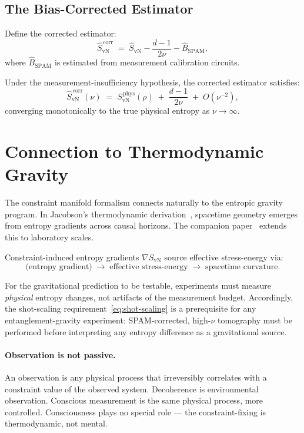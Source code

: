 \documentclass[12pt,letterpaper]{article}
\theoremstyle{plain}
\theoremstyle{definition}
\newcommand{\SvN}{S_{\mathrm{vN}}}
\newcommand{\hSvN}{\hat{S}_{\mathrm{vN}}}
\begin{document}
\subsection{The Bias-Corrected Estimator}

Define the corrected estimator:
\begin{equation}
  \hSvN^{\,\mathrm{corr}}
  \;=\;
  \hSvN - \frac{d-1}{2\nu} - \hat{B}_{\mathrm{SPAM}},
  \label{eq:corrected}
\end{equation}
where $\hat{B}_{\mathrm{SPAM}}$ is estimated from measurement calibration circuits.

Under the measurement-insufficiency hypothesis, the corrected estimator satisfies:
\begin{equation}
  \hSvN^{\,\mathrm{corr}}(\nu)
  \;=\;
  \SvN^{\,\mathrm{phys}}(\rho)
  \;+\;
  \frac{d-1}{2\nu}
  \;+\;
  O\!\left(\nu^{-2}\right),
  \label{eq:convergence}
\end{equation}
converging monotonically to the true physical entropy as $\nu \to \infty$.

\section{Connection to Thermodynamic Gravity}
\label{sec:gravity}

The constraint manifold formalism connects naturally to the entropic gravity program.  In
Jacobson's thermodynamic derivation~\cite{Jacobson1995}, spacetime geometry emerges from
entropy gradients across causal horizons.  The companion paper~\cite{MonetteA2026} extends
this to laboratory scales.

Constraint-induced entropy gradients $\nabla\SvN$ source effective stress-energy via:
\begin{equation}
  \text{(entropy gradient)}
  \;\longrightarrow\;
  \text{effective stress-energy}
  \;\longrightarrow\;
  \text{spacetime curvature}.
\end{equation}

For the gravitational prediction to be testable, experiments must measure \emph{physical}
entropy changes, not artifacts of the measurement budget.  Accordingly, the shot-scaling
requirement~\eqref{eq:shot-scaling} is a prerequisite for any entanglement-gravity experiment:
SPAM-corrected, high-$\nu$ tomography must be performed before interpreting any entropy
difference as a gravitational source.

\paragraph{Observation is not passive.}
An observation is any physical process that irreversibly correlates with a constraint value of
the observed system.  Decoherence is environmental observation.  Conscious measurement is the
same physical process, more controlled.  Consciousness plays no special role --- the
constraint-fixing is thermodynamic, not mental.
\end{document}
